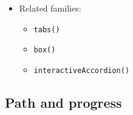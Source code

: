 \begin{itemize}
  \begin{itemize}
  \tightlist
  \item
    rich: collapsible sections with optional keyboard-owned inspection
  \item
    static: show expanded/collapsed state honestly without requiring motion
  \item
    pipe: lower to section headings with visible disclosed content
  \item
    accessible: keep section labels and disclosure state explicit in text
  \end{itemize}
\item
  Related families:

  \begin{itemize}
  \tightlist
  \item
    \texttt{t\allowbreak{}a\allowbreak{}b\allowbreak{}s\allowbreak{}(\allowbreak{})}
  \item
    \texttt{b\allowbreak{}o\allowbreak{}x\allowbreak{}(\allowbreak{})}
  \item
    \texttt{i\allowbreak{}n\allowbreak{}t\allowbreak{}e\allowbreak{}r\allowbreak{}a\allowbreak{}c\allowbreak{}t\allowbreak{}i\allowbreak{}v\allowbreak{}e\allowbreak{}A\allowbreak{}c\allowbreak{}c\allowbreak{}o\allowbreak{}r\allowbreak{}d\allowbreak{}i\allowbreak{}o\allowbreak{}n\allowbreak{}(\allowbreak{})}
  \end{itemize}
\end{itemize}

\subsection{Path and progress}\label{record-019-path-and-progress}

